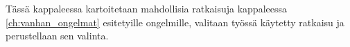 Tässä kappaleessa kartoitetaan mahdollisia ratkaisuja kappaleessa \ref{ch:vanhan_ongelmat} esitetyille ongelmille, valitaan työssä käytetty ratkaisu ja perustellaan sen valinta.
